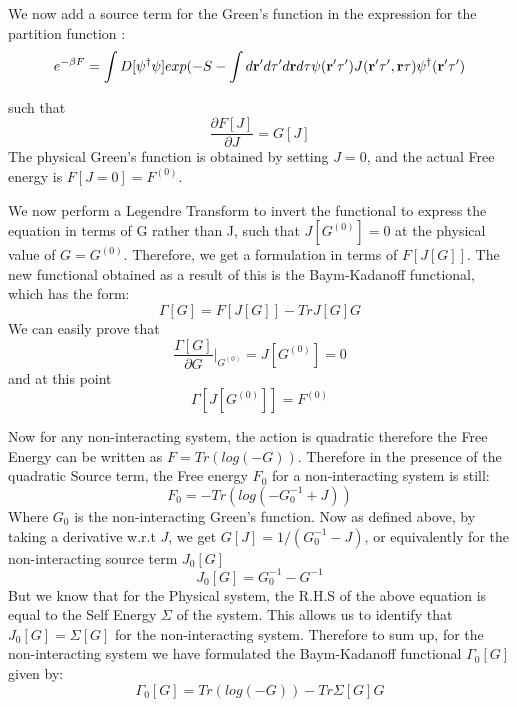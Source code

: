 \documentclass[10pt]{ruthesis}
\begin{document}
We now add a source term for the Green's function in the expression for the partition function :
\begin{equation}
 e^{-\beta F}=\int  D [\psi^\dagger \psi] exp(-S -\int d\mathbf{r}' d\tau' d\mathbf{r} d\tau \psi(\mathbf{r}' \tau') J(\mathbf{r}' \tau', \mathbf{r} \tau)\psi ^\dagger (\mathbf{r}' \tau') 
 \end{equation}

such that 
\begin{equation}
\dfrac{\partial F[J]}{\partial J}= G[J]
\end{equation}
The physical Green's function is obtained by setting $ J=0$, and the actual Free energy is $F[J=0]=F^{(0)}$. 

We now perform a Legendre Transform to invert the functional to express the equation in terms of G rather than J, such that $J[G^{(0)}]=0$ at the physical value of $G=G^{(0)}$. 
Therefore, we get a formulation in terms of $F[J[G]]$. The new functional obtained as a result of this is the Baym-Kadanoff functional, which has the form:
\begin{equation}
\Gamma[G]= F[J[G]] -Tr J[G]G
\end{equation}
 We can easily prove that
 \begin{equation}
 \dfrac{\Gamma[G]}{\partial G}\big|_{G^{(0)}}= J[G^{(0)}]=0 
 \end{equation}
 and at this point
 \begin{equation}
 \Gamma[ J[G^{(0)}]]= F^{(0)}
 \end{equation}
 
 Now for any non-interacting system, the action is quadratic therefore the Free Energy can be written as $F=Tr(log(-G))$. Therefore in the presence of the quadratic Source term, the Free energy $F_0$ for a non-interacting system is still:
 \begin{equation}
 F_{0}= -Tr(log(-G_0^{-1} +J))
 \end{equation}
Where $G_{0}$ is the non-interacting Green's function. Now as defined above, by taking a derivative w.r.t $ J$, we get $G[J]= 1/ (G_0^{-1} -J)$, or equivalently for the non-interacting source term $J_0[G]$
\begin{equation}
 J_0[G]=G_0^{-1}- G^{-1}
 \end{equation} 
But we know that for the Physical system, the R.H.S of the above equation is equal to the Self Energy $\Sigma$ of the system. This allows us to identify that $J_0[G]=\Sigma[G]$ for the non-interacting system. Therefore to sum up, for the non-interacting system we have formulated the Baym-Kadanoff functional $\Gamma_0[G]$ given by:
\begin{equation}
\Gamma_0[G]= Tr(log(-G)) -Tr \Sigma[G]G
\end{equation}
 
\end{document}
